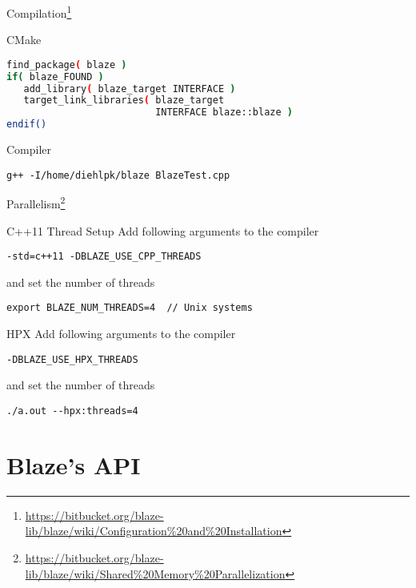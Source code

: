 \documentclass[12pt,t]{beamer}
\begin{document}
\begin{frame}[fragile]{Compilation\footnote{\tiny\url{https://bitbucket.org/blaze-lib/blaze/wiki/Configuration\%20and\%20Installation}}}

\begin{block}{CMake}
\begin{lstlisting}[language=bash]
find_package( blaze )
if( blaze_FOUND )
   add_library( blaze_target INTERFACE )
   target_link_libraries( blaze_target 
                          INTERFACE blaze::blaze )
endif()
\end{lstlisting}
\end{block}

\begin{block}{Compiler}
\begin{lstlisting}
g++ -I/home/diehlpk/blaze BlazeTest.cpp
\end{lstlisting}
\end{block}

\end{frame}


\begin{frame}[fragile]{Parallelism\footnote{\tiny\url{https://bitbucket.org/blaze-lib/blaze/wiki/Shared\%20Memory\%20Parallelization}}}

\begin{block}{C++11 Thread Setup}
Add following arguments to the compiler
\begin{lstlisting}
-std=c++11 -DBLAZE_USE_CPP_THREADS
\end{lstlisting}
and set the number of threads
\begin{lstlisting}
export BLAZE_NUM_THREADS=4  // Unix systems
\end{lstlisting}
\end{block}

\begin{block}{HPX}
Add following arguments to the compiler
\begin{lstlisting}
-DBLAZE_USE_HPX_THREADS
\end{lstlisting}
and set the number of threads
\begin{lstlisting}
./a.out --hpx:threads=4
\end{lstlisting}
\end{block}

\end{frame}

\section{Blaze's API}
\end{document}
